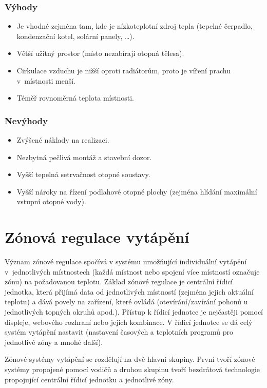 \subsubsection{Výhody}

\begin{itemize}
  \item Je vhodné zejména tam, kde je nízkoteplotní zdroj tepla (tepelné čerpadlo, kondenzační kotel, solární panely, …).
  \item Větší užitný prostor (místo nezabírají otopná tělesa).
  \item Cirkulace vzduchu je nižší oproti radiátorům, proto je víření prachu v~místnosti menší.
  \item Téměř rovnoměrná teplota místnosti.
\end{itemize}

\subsubsection{Nevýhody}

\begin{itemize}
  \item Zvýšené náklady na realizaci.
  \item Nezbytná pečlivá montáž a stavební dozor.
  \item Vyšší tepelná setrvačnost otopné soustavy.
  \item Vyšší nároky na řízení podlahové otopné plochy (zejména hlídání maximální vstupní otopné vody).
\end{itemize}

\section{Zónová regulace vytápění}

Význam zónové regulace spočívá v systému umožňující individuální vytápění v~jednotlivých místnostech (každá místnost nebo spojení více místností označuje zónu) na požadovanou teplotu.  Základ zónové regulace je centrální řídicí jednotka, která přijímá data od jednotlivých místností (zejména jejich aktuální teplotu) a dává povely na zařízení, které ovládá (otevírání/zavírání pohonů u jednotlivých topných okruhů apod.). Přístup k řídicí jednotce je nejčastěji pomocí displeje, webového rozhraní nebo jejich kombinace. V řídicí jednotce se dá celý systém vytápění nastavit (nastavení časových a teplotních programů pro jednotlivé zóny a mnohé další). 

Zónové systémy vytápění se rozdělují na dvě hlavní skupiny. První tvoří zónové systémy propojené pomocí vodičů a druhou skupinu tvoří bezdrátová technologie propojující centrální řídicí jednotku a jednotlivé zóny. 

